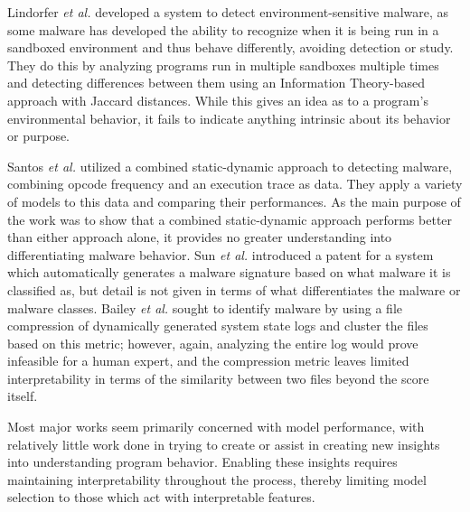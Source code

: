 Lindorfer \textit{et al.} \cite{lindorfer2011detecting} developed a system to detect environment-sensitive malware, as some malware has developed the ability to recognize when it is being run in a sandboxed environment and thus behave differently, avoiding detection or study. They do this by analyzing programs run in multiple sandboxes multiple times and detecting differences between them using an Information Theory-based approach with Jaccard distances. While this gives an idea as to a program's environmental behavior, it fails to indicate anything intrinsic about its behavior or purpose.

Santos \textit{et al.} \cite{santos2013opem} utilized a combined static-dynamic approach to detecting malware, combining opcode frequency and an execution trace as data. They apply a variety of models to this data and comparing their performances. As the main purpose of the work was to show that a combined static-dynamic approach performs better than either approach alone, it provides no greater understanding into differentiating malware behavior. Sun \textit{et al.} \cite{sun_signature_2006} introduced a patent for a system which automatically generates a malware signature based on what malware it is classified as, but detail is not given in terms of what differentiates the malware or malware classes. Bailey \textit{et al.} \cite{bailey2007automated} sought to identify malware by using a file compression of dynamically generated system state logs and cluster the files based on this metric; however, again, analyzing the entire log would prove infeasible for a human expert, and the compression metric leaves limited interpretability in terms of the similarity between two files beyond the score itself.

Most major works seem primarily concerned with model performance, with relatively little work done in trying to create or assist in creating new insights into understanding program behavior. Enabling these insights requires maintaining interpretability throughout the process, thereby limiting model selection to those which act with interpretable features.